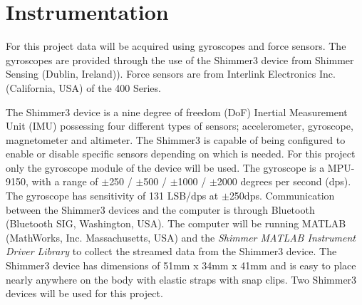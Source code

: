 \section{Instrumentation} \label{methods:instrumentation}

For this project data will be acquired using gyroscopes and force sensors. The gyroscopes are provided through the use of the Shimmer3 device from Shimmer Sensing (Dublin, Ireland)). Force sensors are from Interlink Electronics Inc. (California, USA) of the 400 Series. %

The Shimmer3 device is a nine degree of freedom (DoF) Inertial Measurement Unit (IMU) possessing four different types of sensors; accelerometer, gyroscope, magnetometer and altimeter. The Shimmer3 is capable of being configured to enable or disable specific sensors depending on which is needed. For this project only the gyroscope module of the device will be used. %
The gyroscope is a MPU-9150, with a range of $\pm$250 / $\pm$500 / $\pm$1000 / $\pm$2000 degrees per second (dps). The gyroscope has sensitivity of 131 LSB/dps at $\pm$250dps. \cite{ShimmerSensing2016}
Communication between the Shimmer3 devices and the computer is through Bluetooth (Bluetooth SIG, Washington, USA). The computer will be running MATLAB (MathWorks, Inc. Massachusetts, USA) and the \textit{Shimmer MATLAB Instrument Driver Library} to collect the streamed data from the Shimmer3 device.
The Shimmer3 device has dimensions of 51mm x 34mm x 41mm and is easy to place nearly anywhere on the body with elastic straps with snap clips. Two Shimmer3 devices will be used for this project. %


